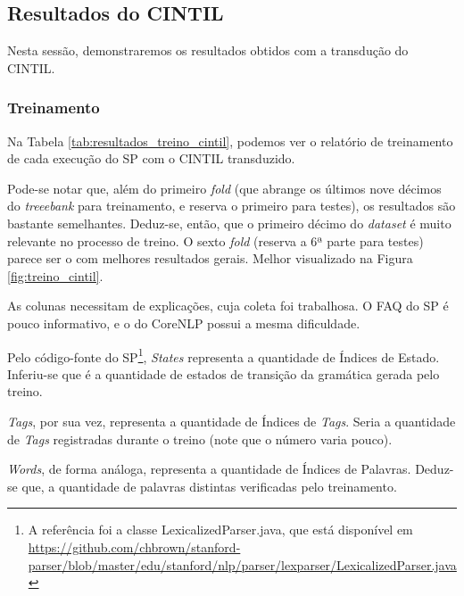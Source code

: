 \subsection{Resultados do CINTIL}
\label{resultados_cintil}
Nesta sessão, demonstraremos os resultados obtidos com a transdução do CINTIL.

\subsubsection{Treinamento} 
\label{result_treino_cintil}

Na Tabela \ref{tab:resultados_treino_cintil}, podemos ver o relatório de treinamento de cada execução do SP com o CINTIL transduzido.
\begin{center}
    
\end{center}

Pode-se notar que, além do primeiro \textit{fold} (que abrange os últimos nove décimos do \textit{treeebank} para treinamento, e reserva o primeiro para testes), os resultados são bastante semelhantes. Deduz-se, então, que o primeiro décimo do \textit{dataset} é muito relevante no processo de treino. O sexto \textit{fold} (reserva a 6ª parte para testes) parece ser o com melhores resultados gerais. 
Melhor visualizado na Figura \ref{fig:treino_cintil}.
\begin{center}
    
\end{center}

As colunas necessitam de explicações, cuja coleta foi trabalhosa. O FAQ do SP é pouco informativo, e o do CoreNLP possui a mesma dificuldade.

Pelo código-fonte do SP\footnote{A referência foi a classe LexicalizedParser.java, que está disponível em \url{https://github.com/chbrown/stanford-parser/blob/master/edu/stanford/nlp/parser/lexparser/LexicalizedParser.java}}, \textit{States} representa a quantidade de Índices de Estado. Inferiu-se que é a quantidade de estados de transição da gramática gerada pelo treino. 

\textit{Tags}, por sua vez, representa a quantidade de Índices de \textit{Tags}. Seria a quantidade de \textit{Tags} registradas durante o treino (note que o número varia pouco).

\textit{Words}, de forma análoga, representa a quantidade de Índices de Palavras. Deduz-se que, a quantidade de palavras distintas verificadas pelo treinamento.

